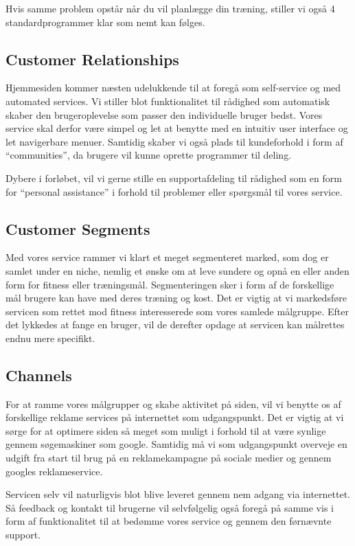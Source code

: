 \documentclass[a4paper,]{article}
\begin{document}
Hvis samme problem opstår når du vil planlægge din træning, stiller vi også 4 standardprogrammer klar som nemt kan følges. 

\subsection{Customer Relationships}
Hjemmesiden kommer næsten udelukkende til at foregå som self-service og med automated services. Vi stiller blot funktionalitet til rådighed som automatisk skaber den brugeroplevelse som passer den individuelle bruger bedst. Vores service skal derfor være simpel og let at benytte med en intuitiv user interface og let navigerbare menuer. Samtidig skaber vi også plads til kundeforhold i form af “communities”, da brugere vil kunne oprette programmer til deling. 

Dybere i forløbet, vil vi gerne stille en supportafdeling til rådighed som en form for “personal assistance” i forhold til problemer eller spørgsmål til vores service. 

\subsection{Customer Segments}
Med vores service rammer vi klart et meget segmenteret marked, som dog er samlet under en niche, nemlig et ønske om at leve sundere og opnå en eller anden form for fitness eller træningsmål. Segmenteringen sker i form af de forskellige mål brugere kan have med deres træning og kost. Det er vigtig at vi markedsføre servicen som rettet mod fitness interesserede som vores samlede målgruppe. Efter det lykkedes at fange en bruger, vil de derefter opdage at servicen kan målrettes endnu mere specifikt.

\subsection{Channels}
For at ramme vores målgrupper og skabe aktivitet på siden, vil vi benytte os af forskellige reklame services på internettet som udgangspunkt. Det er vigtig at vi sørge for at optimere siden så meget som muligt i forhold til at være synlige gennem søgemaskiner som google. Samtidig må vi som udgangspunkt overveje en udgift fra start til brug på en reklamekampagne på sociale medier og gennem googles reklameservice.

Servicen selv vil naturligvis blot blive leveret gennem nem adgang via internettet. Så feedback og kontakt til brugerne vil selvfølgelig også foregå på samme vis i form af funktionalitet til at bedømme vores service og gennem den førnævnte support.
\end{document}
